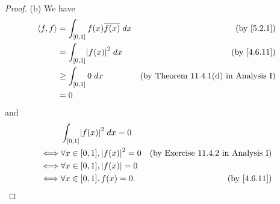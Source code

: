 \begin{proof}{(b)}
  We have
  \begin{align*}
    \inner*{f, f} & = \int_{[0, 1]} f(x) \overline{f(x)} \; dx & \text{(by \cref{5.2.1})}                    \\
                  & = \int_{[0, 1]} \abs{f(x)}^2 \; dx         & \text{(by \cref{4.6.11})}                   \\
                  & \geq \int_{[0, 1]} 0 \; dx                 & \text{(by Theorem 11.4.1(d) in Analysis I)} \\
                  & = 0
  \end{align*}
  and
  \begin{align*}
         & \int_{[0, 1]} \abs{f(x)}^2 \; dx = 0                                               \\
    \iff & \forall x \in [0, 1], \abs{f(x)}^2 = 0 & \text{(by Exercise 11.4.2 in Analysis I)} \\
    \iff & \forall x \in [0, 1], \abs{f(x)} = 0                                               \\
    \iff & \forall x \in [0, 1], f(x) = 0.        & \text{(by \cref{4.6.11})}
  \end{align*}
\end{proof}

